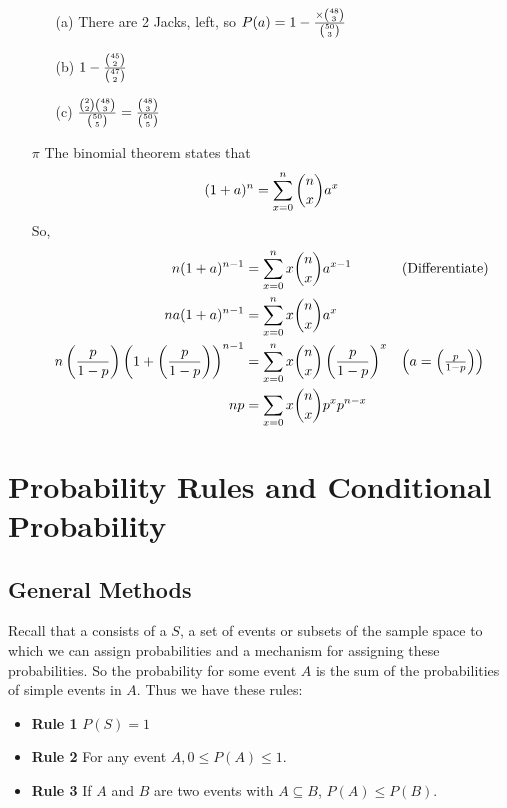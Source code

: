 \documentclass[english, 11pt]{article}
\begin{document}
\begin{itemize}
    \begin{itemize}
      \item[(a)] There are 2 Jacks, left, so $P(a) = 1 - \frac{\times{48 \choose 3}}{{50 \choose 3}}$
      \item[(b)] $1-\frac{{45 \choose 2}}{{47 \choose 2}}$
      \item[(c)] $\frac{{2 \choose 2}{48 \choose 3}}{{50 \choose 5}} = \frac{{48 \choose 3}}{{50 \choose 5}}$
    \end{itemize}
    \item[$\pi$] The binomial theorem states that
    \[ (1+a)^n = \sum_{x=0}^n{n \choose x}a^x \]
    So,
    \begin{align*}
     n(1+a)^{n-1} & = \sum_{x=0}^{n} x {n \choose x}a^{x-1} & \mbox{(Differentiate)}\\
     na(1+a)^{n-1} & =  \sum_{x=0}^{n} x {n \choose x}a^{x} \\
     n\left(\frac{p}{1-p}\right)\left(1+\left(\frac{p}{1-p}\right)\right)^{n-1} & =  \sum_{x=0}^{n} x {n \choose x}\left(\frac{p}{1-p}\right)^{x} & \mbox{$\left(  a = \left(\frac{p}{1-p}\right) \right)$ }\\
     np & = \sum_{x=0}x{n \choose x}p^xp^{n-x}
     \end{align*}
  \end{itemize}

  \section[Conditional]{Probability Rules and Conditional Probability}

  \subsection{General Methods}

  Recall that a  consists of a  $S$, a set of events or subsets of the sample space to which we can assign probabilities and a mechanism for assigning these probabilities. So the probability for some event $A$ is the sum of the probabilities of simple events in $A$. Thus we have these rules:

  \begin{itemize}
    \item \textbf{Rule 1} $P(S) = 1$
    \item \textbf{Rule 2} For any event $A, 0 \leq P(A) \leq 1$.
    \item \textbf{Rule 3} If $A$ and $B$ are two events with $A \subseteq B$, $P(A) \leq P(B)$.
  \end{itemize}
\end{document}

